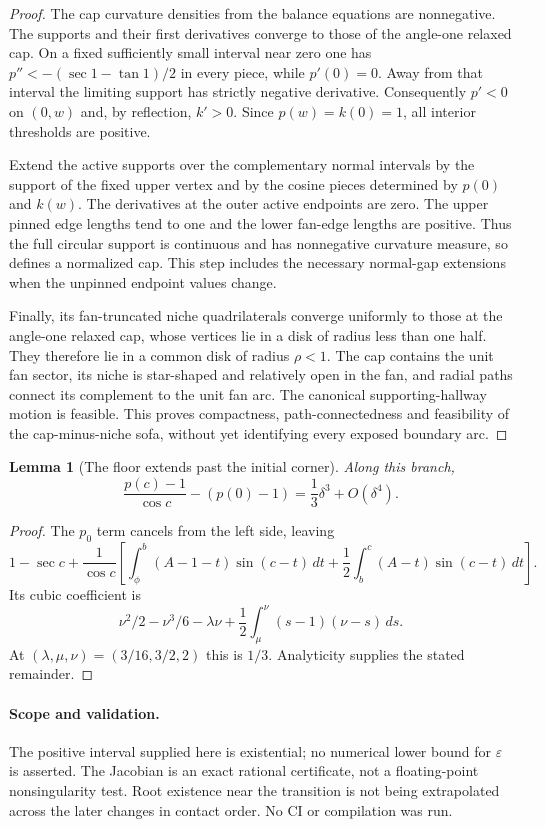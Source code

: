 \documentclass[11pt]{article}
\newtheorem{lemma}{Lemma}
\begin{document}
\begin{proof}
The cap curvature densities from the balance equations are nonnegative. The supports and their first derivatives converge to those of the angle-one relaxed cap. On a fixed sufficiently small interval near zero one has $p''<-(\sec1-\tan1)/2$ in every piece, while $p'(0)=0$. Away from that interval the limiting support has strictly negative derivative. Consequently $p'<0$ on $(0,w)$ and, by reflection, $k'>0$. Since $p(w)=k(0)=1$, all interior thresholds are positive.

Extend the active supports over the complementary normal intervals by the support of the fixed upper vertex and by the cosine pieces determined by $p(0)$ and $k(w)$. The derivatives at the outer active endpoints are zero. The upper pinned edge lengths tend to one and the lower fan-edge lengths are positive. Thus the full circular support is continuous and has nonnegative curvature measure, so defines a normalized cap. This step includes the necessary normal-gap extensions when the unpinned endpoint values change.

Finally, its fan-truncated niche quadrilaterals converge uniformly to those at the angle-one relaxed cap, whose vertices lie in a disk of radius less than one half. They therefore lie in a common disk of radius $\rho<1$. The cap contains the unit fan sector, its niche is star-shaped and relatively open in the fan, and radial paths connect its complement to the unit fan arc. The canonical supporting-hallway motion is feasible. This proves compactness, path-connectedness and feasibility of the cap-minus-niche sofa, without yet identifying every exposed boundary arc.
\end{proof}

\begin{lemma}[The floor extends past the initial corner]
Along this branch,
\[
 \frac{p(c)-1}{\cos c}-(p(0)-1)=\frac13\delta^3+O(\delta^4).
\]
\end{lemma}
\begin{proof}
The $p_0$ term cancels from the left side, leaving
\[
 1-\sec c+\frac1{\cos c}\left[
 \int_\phi^b(A-1-t)\sin(c-t)\,dt+
 \frac12\int_b^c(A-t)\sin(c-t)\,dt\right].
\]
Its cubic coefficient is
\[
 \nu^2/2-\nu^3/6-\lambda\nu
 +\frac12\int_\mu^\nu(s-1)(\nu-s)\,ds.
\]
At $(\lambda,\mu,\nu)=(3/16,3/2,2)$ this is $1/3$. Analyticity supplies the stated remainder.
\end{proof}

\paragraph{Scope and validation.}
The positive interval supplied here is existential; no numerical lower bound for $\varepsilon$ is asserted. The Jacobian is an exact rational certificate, not a floating-point nonsingularity test. Root existence near the transition is not being extrapolated across the later changes in contact order. No CI or compilation was run.
\end{document}
